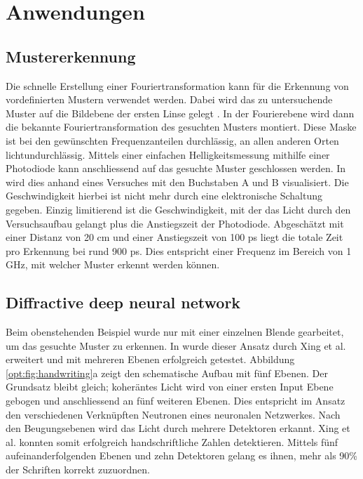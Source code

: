 %
%
%
%
\section{Anwendungen
  \label{opt:section:anwendungen}}

\subsection{Mustererkennung}
Die schnelle Erstellung einer Fouriertransformation kann für die Erkennung von vordefinierten Mustern verwendet werden.
Dabei wird das zu untersuchende Muster auf die Bildebene der ersten Linse gelegt .
In der Fourierebene wird dann die bekannte Fouriertransformation des gesuchten Musters montiert.
Diese Maske ist bei den gewünschten Frequenzanteilen durchlässig, an allen anderen Orten lichtundurchlässig.
Mittels einer einfachen Helligkeitsmessung mithilfe einer Photodiode kann anschliessend auf das gesuchte Muster geschlossen werden.
In \cite{opt:YT:PatternRecognition} wird dies anhand eines Versuches mit den Buchstaben A und B visualisiert.
Die Geschwindigkeit hierbei ist nicht mehr durch eine elektronische Schaltung gegeben.
Einzig limitierend ist die Geschwindigkeit, mit der das Licht durch den Versuchsaufbau gelangt plus die Anstiegszeit der Photodiode.
Abgeschätzt mit einer Distanz von 20 cm und einer Anstiegszeit von 100 ps liegt die totale Zeit pro Erkennung bei rund 900 ps.
Dies entspricht einer Frequenz im Bereich von 1 GHz, mit welcher Muster erkennt werden können.

\subsection{Diffractive deep neural network}
Beim obenstehenden Beispiel wurde nur mit einer einzelnen Blende gearbeitet, um das gesuchte Muster zu erkennen.
In \cite{opt:Lin.2018} wurde dieser Ansatz durch Xing et al. erweitert und mit mehreren Ebenen erfolgreich getestet.
Abbildung \ref{opt:fig:handwriting}a zeigt den schematische Aufbau mit fünf Ebenen.
Der Grundsatz bleibt gleich; koheräntes Licht wird von einer ersten Input Ebene gebogen und anschliessend an fünf weiteren Ebenen.
Dies entspricht im Ansatz den verschiedenen Verknüpften Neutronen eines neuronalen Netzwerkes.
Nach den Beugungsebenen wird das Licht durch mehrere Detektoren erkannt.
Xing et al. konnten somit erfolgreich handschriftliche Zahlen detektieren.
Mittels fünf aufeinanderfolgenden Ebenen und zehn Detektoren gelang es ihnen, mehr als 90\% der Schriften korrekt zuzuordnen.

